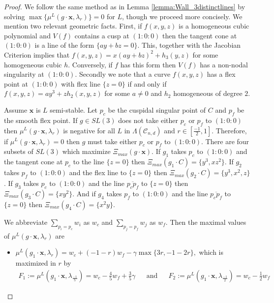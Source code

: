 \documentclass{amsart}
\newcommand{\mc}{\mathcal}
\numberwithin{equation}{section}
\theoremstyle{definition}
\begin{document}
\begin{proof}
 We follow the same method as in Lemma \ref{lemma:Wall_3distinctlines} by solving $\max \{ \mu^L(g \cdot \mathbf{x}, \lambda_r) \} = 0$ for $L$, though we proceed more concisely. We mention two relevant geometric facts. First, if $f(x,y,z)$ is a homogeneous cubic polynomial and $V(f)$ contains a cusp at $(1:0:0)$ then the tangent cone at $(1:0:0)$ is a line of the form $\{ ay+bz=0 \}$. This, together with the Jacobian Criterion implies that $f(x,y,z) = x(ay+bz)^2 + h_3(y,z)$ for some homogeneous cubic $h$. Conversely, if $f$ has this form then $V(f)$ has a non-nodal singularity at $(1:0:0)$. Secondly we note that a curve $f(x,y,z)$ has a flex point at $(1:0:0)$ with flex line $\{z=0\}$ if and only if $f(x,y,z) = ay^3 + zh_2(x,y,z)$ for some $a \neq 0$ and $h_2$ homogeneous of degree $2$.

 Assume $\mathbf{x}$ is $L$ semi-stable. Let $p_c$ be the cuspidal singular point of $C$ and $p_f$ be the smooth flex point. If $g \in SL(3)$ does not take either $p_c$ or $p_f$ to $(1:0:0)$ then $\mu^L(g \cdot \mathbf{x}, \lambda_r)$ is negative for all $L$ in $\Lambda(\mc{C}_{n,d})$ and $r \in [\frac{-1}{2},1]$. Therefore, if $\mu^L(g \cdot \mathbf{x}, \lambda_r)=0$ then $g$ must take either $p_c$ or $p_f$ to $(1:0:0)$. There are four subsets of $SL(3)$ which maximize $\Xi_{max}(g \cdot \mathbf{x}).$ If $g_1$ takes $p_c$ to $(1:0:0)$ and the tangent cone at $p_c$ to the line $\{z=0\}$ then $\Xi_{max}(g_1 \cdot C) = \{y^3, xz^2\}$. If $g_2$ takes $p_f$ to $(1:0:0)$ and the flex line to $\{z=0\}$ then $\Xi_{max}(g_2 \cdot C) = \{y^3, x^2,z\}$. If $g_3$ takes $p_c$ to $(1:0:0)$ and the line $\overline{p_c p_f}$ to $\{z=0\}$ then $\Xi_{max}(g_3 \cdot C) = \{xy^2\}$. And if $g_4$ takes $p_f$ to $(1:0:0)$ and the line $\overline{p_c p_f}$ to $\{z=0\}$ then $\Xi_{max}(g_4 \cdot C) = \{x^2y\}$. 

 We abbreviate $\sum_{p_i = p_c} w_i$ as $w_c$ and $\sum_{p_j = p_f} w_j$ as $w_f$. Then the maximal values of $\mu^L(g \cdot \mathbf{x}, \lambda_r)$ are

 \begin{itemize}
     \item $\mu^L(g_1 \cdot \mathbf{x}, \lambda_r) = w_c + (-1-r)w_f - \gamma \max \{ 3r,-1-2r\},$ which is maximized in $r$ by
     \begin{align*}
        F_1 := \mu^L(g_1 \cdot \mathbf{x}, \lambda_{\frac{-1}{5}}) = w_c - \frac{4}{5}w_f + \frac{3}{5} \gamma
        && \text{and} &&
        F_2 := \mu^L(g_1 \cdot \mathbf{x}, \lambda_{\frac{-1}{2}}) = w_c - \frac{1}{2} w_f
     \end{align*}


\end{itemize}
\end{proof}
\end{document}
